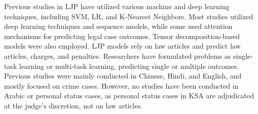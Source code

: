 \documentclass[sn-mathphys,Numbered]{sn-jnl}%
\theoremstyle{thmstyleone}%
\theoremstyle{thmstyletwo}%
\theoremstyle{thmstylethree}%
\begin{document}



Previous studies in LJP have utilized various machine and deep learning techniques, including SVM, LR, and K-Nearest Neighbors. Most studies utilized deep learning techniques and sequence models, while some used attention mechanisms for predicting legal case outcomes. Tensor decomposition-based models were also employed. LJP models rely on law articles and predict law articles, charges, and penalties. Researchers have formulated problems as single-task learning or multi-task learning, predicting single or multiple outcomes. Previous studies were mainly conducted in Chinese, Hindi, and English, and mostly focused on crime cases. However, no studies have been conducted in Arabic or personal status cases, as personal status cases in KSA are adjudicated at the judge's discretion, not on law articles.
\end{document}
